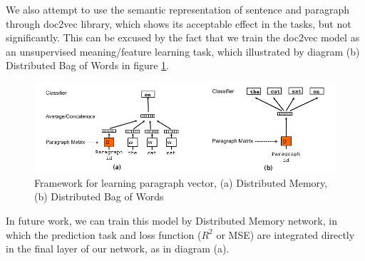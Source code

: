 \documentclass[12pt]{article}
\begin{document}
We also attempt to use the semantic representation of sentence and paragraph through doc2vec library, which shows its acceptable effect in the tasks, but not significantly. This can be excused by the fact that we train the doc2vec model as an unsupervised meaning/feature learning task, which illustrated by diagram (b) Distributed Bag of Words in figure \ref{fig:doc2vec}.

\begin{figure}[t]
	\centering
	\includegraphics[width=\textwidth]{doc2vec}
	\caption{Framework for learning paragraph vector, (a) Distributed Memory, (b) Distributed Bag of Words}
	\label{fig:doc2vec}
\end{figure}

In future work, we can train this model by Distributed Memory network, in which the prediction task and loss function ($R^2$ or MSE) are integrated directly in the final layer of our network, as in diagram (a).

{}

\end{document}
